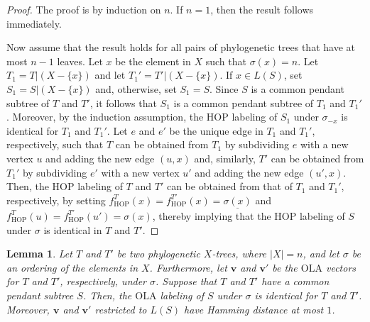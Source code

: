 \documentclass{article}
\newtheorem{lemma}{Lemma}
\newcommand{\HOP}{\mathrm{HOP}}
\newcommand{\OLA}{\mathrm{OLA}}
\newcommand{\ul}{\underline}
\begin{document}
\begin{proof}
The proof is by induction on $n$. If $n=1$, then the result follows immediately. 

Now assume that the result holds for all pairs of phylogenetic trees that have at most $n-1$ leaves. Let $x$ be the element in $X$ such that $\sigma(x)=n$. Let $T_1=T|(X- \{x\})$ and let $T_1'=T'|(X- \{x\})$. If $x\in L(S)$, set $S_1=S|(X- \{x\})$ and, otherwise, set $S_1=S$. Since $S$ is a common pendant subtree of $T$ and $T'$, it follows that  $S_1$ is a common pendant subtree of $T_1$ and $T_1'$. Moreover, by the induction assumption, the $\HOP$ labeling of $S_1$ under $\sigma_{-x}$ is identical for $T_1$ and $T_1'$. Let $e$ and $e'$ be the unique edge in $T_1$ and $T_1'$, respectively, such that $T$ can be obtained from $T_1$ by subdividing $e$ with a new vertex $u$ and adding the new edge $(u,x)$ and, similarly, $T'$ can be obtained from $T_1'$ by subdividing $e'$ with a new vertex $u'$ and adding the new edge $(u',x)$. Then, the HOP labeling of $T$ and $T'$ can be obtained from that of $T_1$ and $T_1'$, respectively, by setting $f_\HOP^T(x)=f_\HOP^{T'}(x)=\ul{\sigma(x)}$ and $f_\HOP^T(u)=f_\HOP^{T'}(u')=\sigma(x)$,
thereby implying that the HOP labeling of $S$ under $\sigma$ is identical in $T$ and $T'$. 
\end{proof}

\begin{lemma}
Let $T$ and $T'$ be two phylogenetic $X$-trees, where $|X|=n$, and let $\sigma$ be an ordering of the elements in $X$. Furthermore, let $\mathbf{v}$ and $\mathbf{v}'$  be the $\OLA$ vectors for  $T$ and $T'$, respectively, under $\sigma$.
Suppose that $T$ and $T'$ have a common pendant subtree $S$. Then, the $\OLA$  labeling of $S$ under $\sigma$ is identical for $T$ and $T'$. Moreover, $\mathbf{v}$ and $\mathbf{v}'$  restricted to  $L(S)$ have Hamming distance at most $1$.
\label{lem:subtree-labeling2}
\end{lemma}
\end{document}
